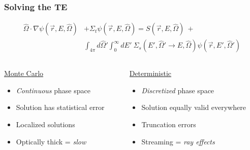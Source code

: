 \documentclass[xcolor=x11names,compress]{beamer}
\renewcommand{\(}{\begin{columns}}
\renewcommand{\)}{\end{columns}}
\newcommand{\<}[1]{\begin{column}{#1}}
\renewcommand{\>}{\end{column}}
\newcommand{\vOmega}{\ensuremath{\hat{\Omega}}}
\begin{document}
\begin{frame}[fragile]
  \frametitle{Solving the TE}
  \begin{align}
\vOmega \cdot \nabla \psi(\vec{r}, E, \vOmega) &+
\Sigma_t \psi(\vec{r}, E, \vOmega) = S(\vec{r}, E, \vOmega) \:+\nonumber\\
%
& \int_{4\pi} d\vOmega' \int_0^{\infty} dE'\: \Sigma_s(E', \vOmega' \rightarrow E, \vOmega) \psi(\vec{r}, E', \vOmega') \nonumber
\end{align}
%
\begin{columns}
  \begin{column}{0.5\textwidth}
  \begin{center}
  \underline{Monte Carlo}
  \end{center}
  \vspace*{-1em}
	\begin{itemize}
	\item \textit{Continuous} phase space%
	\item Solution has statistical error
	\item Localized solutions
	\item Optically thick = \textit{slow}
	\end{itemize}
  \end{column}
  \begin{column}{0.5\textwidth}
  \begin{center}
  \underline{Deterministic}
  \end{center}
  \vspace*{-1em}
	\begin{itemize}
	\item \textit{Discretized} phase space%
	\item Solution equally valid everywhere
	\item Truncation errors
	\item Streaming = \textit{ray effects}
	\end{itemize}
  \end{column}
\end{columns}

\end{frame}
\end{document}
